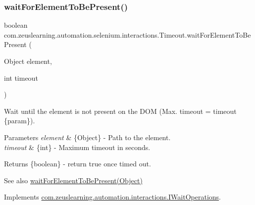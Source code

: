 \subsubsection{\texorpdfstring{wait\+For\+Element\+To\+Be\+Present()}{waitForElementToBePresent()}\hspace{0.1cm}{\footnotesize\ttfamily [2/2]}}
{\footnotesize\ttfamily boolean com.\+zeuslearning.\+automation.\+selenium.\+interactions.\+Timeout.\+wait\+For\+Element\+To\+Be\+Present (\begin{DoxyParamCaption}\item[{Object}]{element,  }\item[{int}]{timeout }\end{DoxyParamCaption})\hspace{0.3cm}{\ttfamily [inline]}}

Wait until the element is not present on the D\+OM (Max. timeout = timeout \{param\}).


\begin{DoxyParams}{Parameters}
{\em element} & \{Object\} -\/ Path to the element. \\
\hline
{\em timeout} & \{int\} -\/ Maximum timeout in seconds.\\
\hline
\end{DoxyParams}
\begin{DoxyReturn}{Returns}
\{boolean\} -\/ return {\ttfamily true} once timed out.
\end{DoxyReturn}
\begin{DoxySeeAlso}{See also}
\hyperlink{classcom_1_1zeuslearning_1_1automation_1_1selenium_1_1interactions_1_1Timeout_a5b1fb9f2a2d0d61ec2b882269a3826d5}{wait\+For\+Element\+To\+Be\+Present(\+Object)} 
\end{DoxySeeAlso}


Implements \hyperlink{interfacecom_1_1zeuslearning_1_1automation_1_1interactions_1_1IWaitOperations_a768e53257a1c960d74e048b1aa5fe145}{com.\+zeuslearning.\+automation.\+interactions.\+I\+Wait\+Operations}.

\hypertarget{classcom_1_1zeuslearning_1_1automation_1_1selenium_1_1interactions_1_1Timeout_adefb45ce06aba9bedc30a707f41ebe3f}{}\label{classcom_1_1zeuslearning_1_1automation_1_1selenium_1_1interactions_1_1Timeout_adefb45ce06aba9bedc30a707f41ebe3f} 
